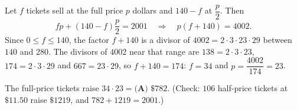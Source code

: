 Let $f$ tickets sell at the full price $p$ dollars and $140-f$ at $\dfrac {p}{2}$. Then
\[
fp+(140-f)\dfrac {p}{2}=2001\quad\Longrightarrow\quad p(f+140)=4002 .
\]
Since $0\le f\le140$, the factor $f+140$ is a divisor of $4002=2\cdot3\cdot23\cdot29$ between $140$ and $280$. The divisors of $4002$ near that range are $138=2\cdot3\cdot23$, $174=2\cdot3\cdot29$ and $667=23\cdot29$, so $f+140=174$: $f=34$ and $p=\dfrac{4002}{174}=23$.

The full-price tickets raise $34\cdot23=\boxed{\textbf{(A) }\$782}$. (Check: $106$ half-price tickets at $\$11.50$ raise $\$1219$, and $782+1219=2001$.)
